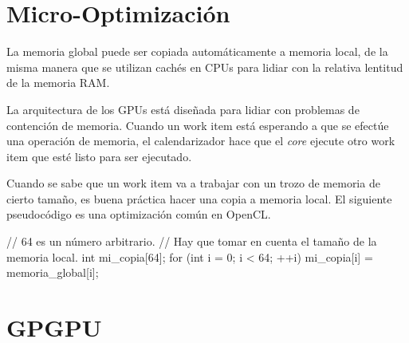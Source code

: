 \section{Micro-Optimización}


La memoria global puede ser copiada automáticamente a memoria local, de la
misma manera que se utilizan cachés en CPUs para lidiar con la relativa
lentitud de la memoria RAM.

La arquitectura de los GPUs está diseñada para lidiar con problemas de
contención de memoria. Cuando un work item está esperando a que se efectúe una
operación de memoria, el calendarizador hace que el \emph{core} ejecute otro
work item que esté listo para ser ejecutado.

Cuando se sabe que un work item va a trabajar con un trozo de memoria de cierto
tamaño, es buena práctica hacer una copia a memoria local. El siguiente
pseudocódigo es una optimización común en OpenCL.

\label{alg:gpgpu-memcpy}
\begin{code}[language=C][h]
    // 64 es un número arbitrario.
    // Hay que tomar en cuenta el tamaño de la memoria local.
    int mi_copia[64];
    for (int i = 0; i < 64; ++i) {
        mi_copia[i] = memoria_global[i];
    }
\end{code}



\section{GPGPU} \label{sec:GPGPU}
